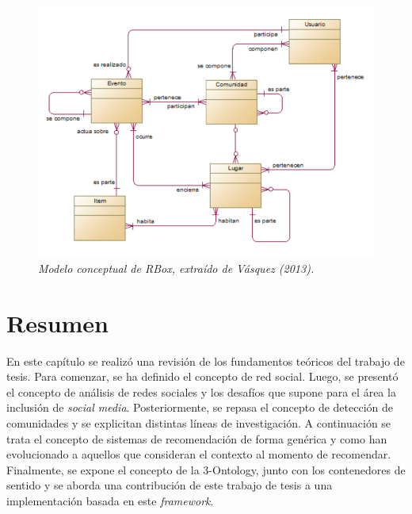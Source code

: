 \begin{figure}
	\centering
	\includegraphics[scale=.5]{images/Figura2-2}
	\caption{\em Modelo conceptual de RBox, extraído de Vásquez (2013). }
	\label{fig:mt-im2}
\end{figure}

\section{Resumen}

En este capítulo se realizó una revisión de los fundamentos teóricos del trabajo de tesis. Para comenzar, se ha definido el concepto de red social. Luego, se presentó el concepto de análisis de redes sociales y los desafíos que supone para el área la inclusión de \textit{social media}. Posteriormente, se repasa el concepto de detección de comunidades y se explicitan distintas líneas de investigación. A continuación se trata el concepto de sistemas de recomendación de forma genérica y como han evolucionado a aquellos que consideran el contexto al momento de recomendar. Finalmente, se expone el concepto de la 3-Ontology, junto con los contenedores de sentido y se aborda una contribución de este trabajo de tesis a una implementación basada en este \textit{framework}.

